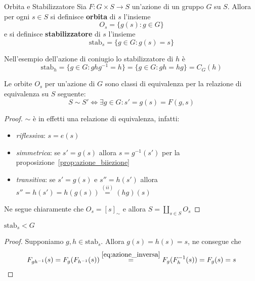 \begin{definition}{Orbita e Stabilizzatore}
    Sia \(F : G \times  S \to S\) un'azione di un gruppo \(G\) su \(S\). Allora
    per ogni \(s \in S\) si definisce \textbf{orbita} di \(s\) l'insieme
    \[
        O_s = \{g{(s)} : g \in G\}
    \]
    e si definisce \textbf{stabilizzatore} di \(s\) l'insieme
    \[
        \mathrm{stab}_s = \{g \in G : g{(s)} = s\}
    \]
\end{definition}
\begin{example}
    Nell'esempio dell'azione di coniugio lo stabilizzatore di \(h\) è
    \[
        \mathrm{stab}_h = \{g \in G : ghg^{-1} = h\} = \{g \in G : gh = hg\} =
        C_G{(h)}
    \]
\end{example}

\begin{proposition}

Le orbite \(O_s\) per un'azione di \(G\) sono classi di equivalenza per la
relazione di equivalenza su \(S\) seguente:
\[
  S \sim S' \iff \exists g \in G : s' = g{(s)} = F{(g, s)}
\]
\end{proposition}
\begin{proof}
\(\sim\) è in effetti una relazione di equivalenza, infatti:
\begin{itemize}[label = --]
    \item \emph{riflessiva}: \(s = e{(s)}\)
    \item \emph{simmetrica}: se \(s' = g{(s)}\) allora \(s = g^{-1}{(s')}\)
        per la proposizione~\ref{prop:azione_biiezione}
    \item \emph{transitiva}: se \(s' = g{(s)}\) e \(s'' = h{(s')}\) allora
        \(s'' = h{(s')} = h{(g{(s)})} \overset{(ii)}{=} {(hg)}{(s)}\)
\end{itemize}

Ne segue chiaramente che \(O_s = {[s]}_\sim \) e allora \(\displaystyle S = \coprod_{s \in S}
O_s\) 
\end{proof}
\begin{proposition}
    \(\mathrm{stab}_s < G\) 
\end{proposition}
\begin{proof}
    Supponiamo \(g, h \in \mathrm{stab}_s\). Allora \(g{(s)} = h{(s)} = s\), ne
    consegue che
    \[
        F_{gh^{-1}} {(s)} = F_{g} {(F_{h^{-1}} {(s)})}
        \overset{\eqref{eq:azione_inversa}}{=} F_g {(F^{-1}_h{(s)})} =
        F_g {(s)} = s
    \]
\end{proof}





